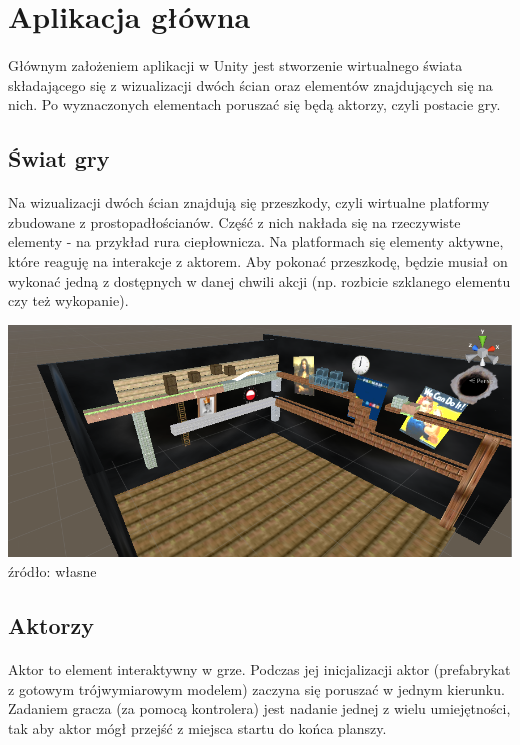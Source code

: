 \newpage
\section{Aplikacja główna}
\paragraph{}
Głównym założeniem aplikacji w Unity jest stworzenie wirtualnego świata składającego się z wizualizacji dwóch ścian oraz elementów znajdujących się na nich. Po wyznaczonych elementach poruszać się będą aktorzy, czyli postacie gry.

\subsection{Świat gry}
\paragraph{}
Na wizualizacji dwóch ścian znajdują się przeszkody, czyli wirtualne platformy zbudowane z prostopadłościanów. Część z nich nakłada się na rzeczywiste elementy - na przykład rura ciepłownicza. Na platformach się elementy aktywne, które reaguję na interakcje z aktorem. Aby pokonać przeszkodę, będzie musiał on wykonać jedną z dostępnych w danej chwili akcji (np. rozbicie szklanego elementu czy też wykopanie).

\begin{center}
\includegraphics[width=1\textwidth]{images/swiatgry.png}
\small {źródło: własne }
\end{center}


\subsection{Aktorzy}
\paragraph{}
Aktor to element interaktywny w grze. Podczas jej inicjalizacji aktor (prefabrykat z gotowym trójwymiarowym modelem) zaczyna się poruszać w jednym kierunku. Zadaniem gracza (za pomocą kontrolera) jest nadanie jednej z wielu umiejętności, tak aby aktor mógł przejść z miejsca startu do końca planszy.

